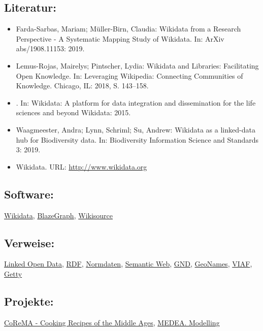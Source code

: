 \documentclass{article}
\begin{document}
        \subsection*{Literatur:}\begin{itemize}\item Farda-Sarbas, Mariam; Müller-Birn, Claudia: Wikidata from a Research Perspective - A Systematic
                              Mapping Study of Wikidata. In: ArXiv abs/1908.11153: 2019.\item Lemus-Rojas, Mairelys; Pintscher, Lydia: Wikidata and Libraries: Facilitating Open
                              Knowledge. In: Leveraging Wikipedia: Connecting Communities of
                              Knowledge. Chicago, IL: 2018, S. 143–158.\item . In: Wikidata: A platform for data integration and
                              dissemination for the life sciences and beyond Wikidata: 2015.\item Waagmeester, Andra; Lynn, Schriml; Su, Andrew: Wikidata as a linked-data hub for Biodiversity
                              data. In: Biodiversity Information Science and Standards 3: 2019.\item Wikidata. URL: \url{http://www.wikidata.org}\end{itemize}\subsection*{Software:}\href{https://www.wikidata.org/wiki/Wikidata:Main_Page}{Wikidata}, \href{https://www.blazegraph.com/}{BlazeGraph}, \href{http://en.wikisource.org/wiki/Main_Page}{Wikisource}\subsection*{Verweise:}\href{https://gams.uni-graz.at/o:konde.8}{Linked Open Data}, \href{https://gams.uni-graz.at/o:konde.131}{RDF}, \href{https://gams.uni-graz.at/o:konde.147}{Normdaten}, \href{https://gams.uni-graz.at/o:konde.167}{Semantic Web}, \href{https://gams.uni-graz.at/o:konde.109}{GND}, \href{https://gams.uni-graz.at/o:konde.107}{GeoNames}, \href{https://gams.uni-graz.at/o:konde.111}{VIAF}, \href{https://gams.uni-graz.at/o:konde.108}{Getty}\subsection*{Projekte:}\href{https://gams.uni-graz.at/corema}{CoReMA -
                           Cooking Recipes of the Middle Ages}, \href{https://medea.hypotheses.org}{MEDEA. Modelling
}
\end{document}
